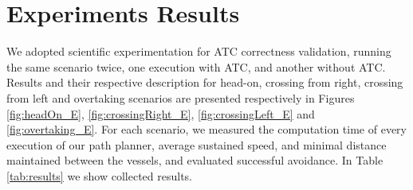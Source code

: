     
    \section{Experiments Results}
    
        We adopted scientific experimentation for \ac{ATC} correctness validation, running the same scenario twice, one execution with \ac{ATC}, and another without \ac{ATC}. Results and their respective description for head-on, crossing from right, crossing from left and overtaking scenarios are presented respectively in Figures \ref{fig:headOn_E}, \ref{fig:crossingRight_E}, \ref{fig:crossingLeft_E} and \ref{fig:overtaking_E}. For each scenario, we measured the computation time of every execution of our path planner, average sustained speed, and minimal distance maintained between the vessels, and evaluated successful avoidance. In Table \ref{tab:results} we show collected results.
        
